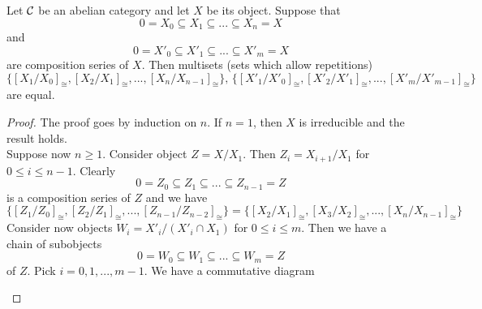 \begin{theorem}\label{theorem:JordanHölder_equivalence}
Let ${\mathcal C}$ be an abelian category and let $X$ be its object. Suppose that
$$0=X_0 \subseteq X_1\subseteq ...\subseteq X_n = X$$
and
$$0=X'_0 \subseteq X'_1\subseteq ...\subseteq X'_m = X$$
are composition series of $X$. Then multisets (sets which allow repetitions)
$$\{[X_1/X_0]_{\cong},[X_2/X_1]_{\cong},...,[X_n/X_{n-1}]_{\cong}\},\,\{[X'_1/X'_0]_{\cong},[X'_2/X'_1]_{\cong},...,[X'_m/X'_{m-1}]_{\cong}\}$$
are equal.
\end{theorem}
\begin{proof}
The proof goes by induction on $n$. If $n=1$, then $X$ is irreducible and the result holds.\\
Suppose now $n\geq 1$. Consider object $Z = X/X_1$. Then $Z_i = X_{i+1}/X_1$ for $0\leq i\leq n-1$. Clearly
$$0=Z_0\subseteq Z_1\subseteq ...\subseteq Z_{n-1} = Z$$
is a composition series of $Z$ and we have
$$\{[Z_1/Z_0]_{\cong},[Z_2/Z_1]_{\cong},...,[Z_{n-1}/Z_{n-2}]_{\cong}\} = \{[X_2/X_1]_{\cong},[X_3/X_2]_{\cong},...,[X_n/X_{n-1}]_{\cong}\}$$
Consider now objects $W_i = X'_i/(X'_i\cap X_1)$ for $0\leq i\leq m$. Then we have a chain of subobjects
$$0 = W_0 \subseteq W_1\subseteq ...\subseteq W_m = Z$$
of $Z$. Pick $i = 0,1,...,m-1$. We have a commutative diagram
\begin{center}
\end{center}
\end{proof}
